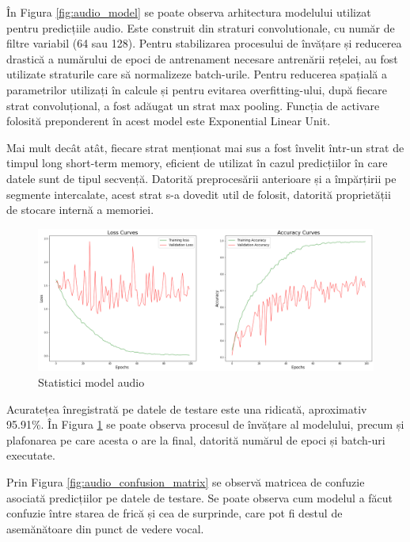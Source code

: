 \documentclass[a4paper, 12pt]{report}
\begin{document}
 	În Figura \ref{fig:audio_model} se poate observa arhitectura modelului utilizat pentru predicțiile audio. Este construit din straturi convolutionale, cu număr de filtre variabil (64 sau 128). Pentru stabilizarea procesului de învățare și reducerea drastică a numărului de epoci de antrenament necesare antrenării rețelei, au fost utilizate straturile care să normalizeze batch-urile. Pentru reducerea spațială a parametrilor utilizați în calcule și pentru evitarea overfitting-ului, după fiecare strat convoluțional, a fost adăugat un strat max pooling. Funcția de activare folosită preponderent în acest model este Exponential Linear Unit. 
 	
 	Mai mult decât atât, fiecare strat menționat mai sus a fost învelit într-un strat de timpul long short-term memory, eficient de utilizat în cazul predicțiilor în care datele sunt de tipul secvență. Datorită preprocesării anterioare și a împărțirii pe segmente intercalate, acest strat s-a dovedit util de folosit, datorită proprietății de stocare internă a memoriei.
	
	\begin{figure}[H]
		\begin{center}
			\includegraphics[scale=0.2]{images/accuracy_audio_model.png}
		\end{center}
		\caption{Statistici model audio}
		\label{fig:audio_model_accuracy}
	\end{figure}
	
	Acuratețea înregistrată pe datele de testare este una ridicată, aproximativ 95.91\%. În Figura \ref{fig:audio_model_accuracy} se poate observa procesul de învățare al modelului, precum și plafonarea pe care acesta o are la final, datorită numărul de epoci și batch-uri executate.
	
	Prin Figura \ref{fig:audio_confusion_matrix} se observă matricea de confuzie asociată predicțiilor pe datele de testare. Se poate observa cum modelul a făcut confuzie între starea de frică și cea de surprinde, care pot fi destul de asemănătoare din punct de vedere vocal.
	
\end{document}
